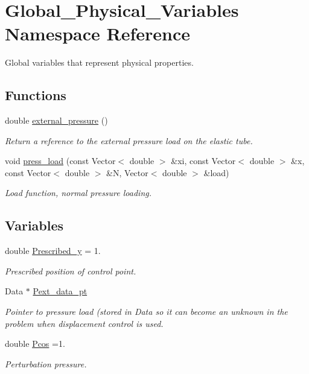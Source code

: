 \hypertarget{namespaceGlobal__Physical__Variables}{}\section{Global\+\_\+\+Physical\+\_\+\+Variables Namespace Reference}
\label{namespaceGlobal__Physical__Variables}


Global variables that represent physical properties.  


\subsection*{Functions}
\begin{DoxyCompactItemize}
\item 
double \hyperlink{namespaceGlobal__Physical__Variables_a80149b39ce76ea0a779f7493905eb1b8}{external\+\_\+pressure} ()
\begin{DoxyCompactList}\small\item\em Return a reference to the external pressure load on the elastic tube. \end{DoxyCompactList}\item 
void \hyperlink{namespaceGlobal__Physical__Variables_a86fd8f502cb8c4c7939ffae742f023eb}{press\+\_\+load} (const Vector$<$ double $>$ \&xi, const Vector$<$ double $>$ \&x, const Vector$<$ double $>$ \&N, Vector$<$ double $>$ \&load)
\begin{DoxyCompactList}\small\item\em Load function, normal pressure loading. \end{DoxyCompactList}\end{DoxyCompactItemize}
\subsection*{Variables}
\begin{DoxyCompactItemize}
\item 
double \hyperlink{namespaceGlobal__Physical__Variables_aa2f7ea98cb8462b3920a026bed5f6099}{Prescribed\+\_\+y} = 1.
\begin{DoxyCompactList}\small\item\em Prescribed position of control point. \end{DoxyCompactList}\item 
Data $\ast$ \hyperlink{namespaceGlobal__Physical__Variables_ae5107b48f68b31302f3d37b038739904}{Pext\+\_\+data\+\_\+pt}
\begin{DoxyCompactList}\small\item\em Pointer to pressure load (stored in Data so it can become an unknown in the problem when displacement control is used. \end{DoxyCompactList}\item 
double \hyperlink{namespaceGlobal__Physical__Variables_ab55734aaa66260cd9d4bf68a4ecafdd5}{Pcos} =1.
\begin{DoxyCompactList}\small\item\em Perturbation pressure. \end{DoxyCompactList}\end{DoxyCompactItemize}



